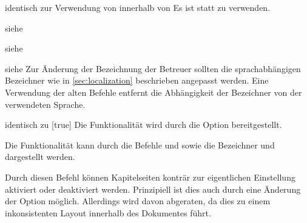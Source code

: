 \begin{Declaration*}{}
\begin{Declaration}{}{%
  identisch zur Verwendung von  innerhalb von %
}
\printdeclarationlist*%
%
Es ist 
statt  zu verwenden.
\end{Declaration}

\begin{Declaration}{}{%
  siehe %
}
\begin{Declaration}{}{%
  siehe %
}
\begin{Declaration}{}{%
  siehe %
}
\printdeclarationlist*%
%
Zur Änderung der Bezeichnung der Betreuer sollten die sprachabhängigen 
Bezeichner wie in \autoref{sec:localization} beschrieben angepasst werden. Eine 
Verwendung der alten Befehle entfernt die Abhängigkeit der Bezeichner von der 
verwendeten Sprache.
\end{Declaration}
\end{Declaration}
\end{Declaration}

\begin{Declaration}{}{%
  identisch zu [true]%
}
\printdeclarationlist*%
%
Die Funktionalität wird durch die Option  bereitgestellt.
\end{Declaration}

\begin{Declaration}{}
\printdeclarationlist*%
%
Die Funktionalität kann durch die Befehle  und 
 sowie die Bezeichner  und 
 dargestellt werden.
\end{Declaration}

\begin{Declaration}{}
\printdeclarationlist*%
%
Durch diesen Befehl können Kapitelseiten konträr zur eigentlichen Einstellung 
aktiviert oder deaktiviert werden. Prinzipiell ist dies auch durch eine 
Änderung der Option  möglich. Allerdings wird davon 
abgeraten, da dies zu einem inkonsistenten Layout innerhalb des Dokumentes 
führt.
\end{Declaration}


\end{Declaration*}
